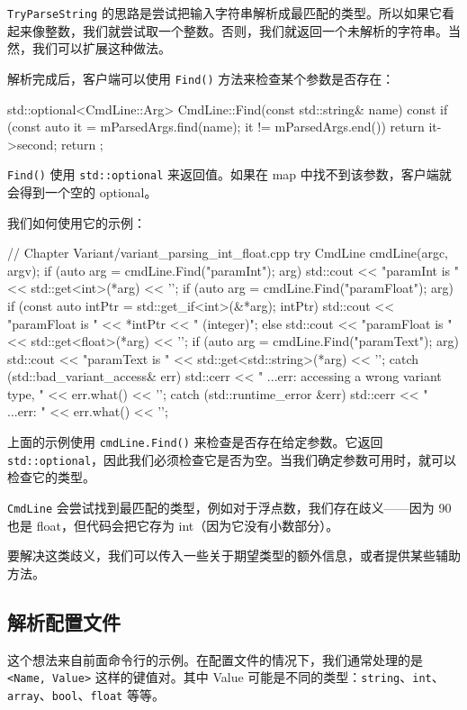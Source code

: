 \texttt{TryParseString} 的思路是尝试把输入字符串解析成最匹配的类型。所以如果它看起来像整数，我们就尝试取一个整数。否则，我们就返回一个未解析的字符串。当然，我们可以扩展这种做法。

解析完成后，客户端可以使用 \texttt{Find()} 方法来检查某个参数是否存在：

\begin{codebox}[cpp]
std::optional<CmdLine::Arg> CmdLine::Find(const std::string& name) const
{
if (const auto it = mParsedArgs.find(name); it != mParsedArgs.end())
return it->second;
return { };
}
\end{codebox}

\texttt{Find()} 使用 \texttt{std::optional} 来返回值。如果在 map 中找不到该参数，客户端就会得到一个空的 optional。

我们如何使用它的示例：

\begin{codebox}[cpp]
// Chapter Variant/variant_parsing_int_float.cpp
try
{
CmdLine cmdLine(argc, argv);
if (auto arg = cmdLine.Find("paramInt"); arg)
std::cout << "paramInt is " << std::get<int>(*arg) << '\n';
if (auto arg = cmdLine.Find("paramFloat"); arg)
{
if (const auto intPtr = std::get_if<int>(&*arg); intPtr)
std::cout << "paramFloat is " << *intPtr << " (integer)\n";
else
std::cout << "paramFloat is " << std::get<float>(*arg) << '\n';
}
if (auto arg = cmdLine.Find("paramText"); arg)
std::cout << "paramText is " << std::get<std::string>(*arg) << '\n';
}
catch (std::bad_variant_access& err)
{
std::cerr << " ...err: accessing a wrong variant type, "
<< err.what() << '\n';
}
catch (std::runtime_error &err)
{
std::cerr << " ...err: " << err.what() << '\n';
}
\end{codebox}

上面的示例使用 \texttt{cmdLine.Find()} 来检查是否存在给定参数。它返回 \texttt{std::optional}，因此我们必须检查它是否为空。当我们确定参数可用时，就可以检查它的类型。

\texttt{CmdLine} 会尝试找到最匹配的类型，例如对于浮点数，我们存在歧义——因为 90 也是 float，但代码会把它存为 int（因为它没有小数部分）。

要解决这类歧义，我们可以传入一些关于期望类型的额外信息，或者提供某些辅助方法。

\subsection{解析配置文件}

这个想法来自前面命令行的示例。在配置文件的情况下，我们通常处理的是 \texttt{<Name, Value>} 这样的键值对。其中 Value 可能是不同的类型：\texttt{string}、\texttt{int}、\texttt{array}、\texttt{bool}、\texttt{float} 等等。

